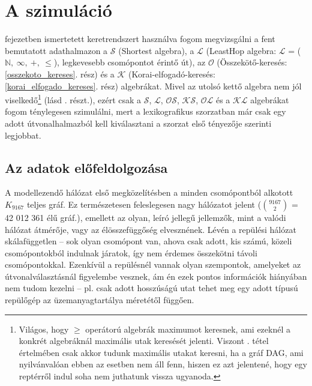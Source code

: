   \section{A szimuláció}
   fejezetben ismertetett keretrendszert használva fogom megvizsgálni a fent bemutatott adathalmazon a $\mathcal{S}$ (Shortest algebra), a $\mathcal{L}$ (LeastHop algebra: $\mathcal{L}$ = ($\mathbb{N},~\infty,~+,~\leq$), legkevesebb csomópontot érintő út), az $\mathcal{O}$ (Összekötő-keresés: \ref{osszekoto_kereses}. rész) és a $\mathcal{K}$ (Korai-elfogadó-keresés: \ref{korai_elfogado_kereses}. rész) algebrákat. Mivel az utolsó kettő algebra nem jól viselkedő\footnote{Világos, hogy $\geq$ operátorú algebrák maximumot keresnek, ami ezeknél a konkrét algebráknál maximális utak keresését jelenti. Viszont . tétel értelmében csak akkor tudunk maximális utakat keresni, ha a gráf DAG, ami nyilvánvalóan ebben az esetben nem áll fenn, hiszen ez azt jelentené, hogy egy reptérről indul soha nem juthatunk vissza ugyanoda.} (lásd . részt.), ezért csak a $\mathcal{S}$, $\mathcal{L}$, $\mathcal{OS}$, $\mathcal{KS}$, $\mathcal{OL}$ és a $\mathcal{KL}$ algebrákat fogom ténylegesen szimulálni, mert a lexikografikus szorzatban már csak egy adott útvonalhalmazból kell kiválasztani a szorzat első tényezője szerinti legjobbat.

    \subsection{Az adatok előfeldolgozása}
    A modellezendő hálózat első megközelítésben a minden csomópontból alkotott $K_{9167}$ teljes gráf. Ez természetesen feleslegesen nagy hálózatot jelent ($9167 \choose 2$ = 42 012 361 élű gráf.), emellett az olyan, leíró jellegű jellemzők, mint a valódi hálózat átmérője, vagy az élösszefüggőség elvesznének. Lévén a repülési hálózat skálafüggetlen -- sok olyan csomópont van, ahova csak adott, kis számú, közeli csomópontokból indulnak járatok, így nem érdemes összekötni távoli csomópontokkal. Ezenkívül a repülésnél vannak olyan szempontok, amelyeket az útvonalválasztásnál figyelembe vesznek, ám én ezek pontos információk hiányában nem tudom kezelni -- pl. csak adott hosszúságú utat tehet meg egy adott típusú repülőgép az üzemanyagtartálya méretétől függően.\\

